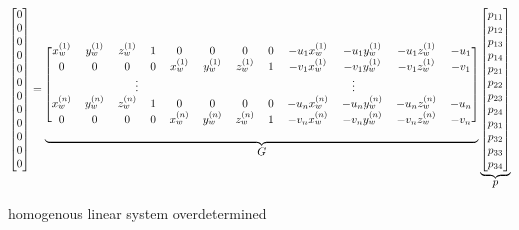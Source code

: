 \setcounter{MaxMatrixCols}{20}
\begin{equation}
    \scalemath{0.9}{
    \begin{bmatrix}
        0 \\ 0 \\ 0 \\ 0 \\ 0 \\ 0 \\ 0 \\ 0 \\ 0 \\ 0 \\ 0 \\ 0
    \end{bmatrix}
    =
    \underbrace{
        \begin{blockarray}{[*{12}c]}
            x_w^{(1)} & y_w^{(1)} & z_w^{(1)} & 1 & 0         & 0         & 0         & 0 & -u_1 x_w^{(1)} & -u_1 y_w^{(1)} & -u_1 z_w^{(1)} & -u_1 \\
            0         & 0         & 0         & 0 & x_w^{(1)} & y_w^{(1)} & z_w^{(1)} & 1 & -v_1 x_w^{(1)} & -v_1 y_w^{(1)} & -v_1 z_w^{(1)} & -v_1 \\
            \BAmulticolumn{6}{c}{\vdots} & \BAmulticolumn{6}{c}{\vdots} \\
            x_w^{(n)} & y_w^{(n)} & z_w^{(n)} & 1 & 0         & 0         & 0         & 0 & -u_n x_w^{(n)} & -u_n y_w^{(n)} & -u_n z_w^{(n)} & -u_n \\
            0         & 0         & 0         & 0 & x_w^{(n)} & y_w^{(n)} & z_w^{(n)} & 1 & -v_n x_w^{(n)} & -v_n y_w^{(n)} & -v_n z_w^{(n)} & -v_n
        \end{blockarray}
    }_{\mathlarger{G}}
    \underbrace{
        \begin{bmatrix}
            p_{11} \\ p_{12} \\ p_{13} \\ p_{14} \\ p_{21} \\ p_{22} \\ p_{23} \\ p_{24} \\ p_{31} \\ p_{32} \\ p_{33} \\ p_{34}
        \end{bmatrix}
    }_{\mathlarger{p}}
    }
\end{equation}

homogenous linear system
overdetermined


